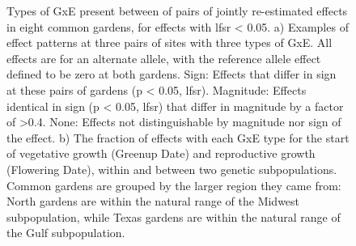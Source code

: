 \documentclass[
  9pt,
  twocolumn,
  twoside]{pnas-new}
\begin{document}
\begin{figure}


\caption{\label{fig-effects}Types of GxE present between of pairs of
jointly re-estimated effects in eight common gardens, for effects with
lfsr \textless{} 0.05. a) Examples of effect patterns at three pairs of
sites with three types of GxE. All effects are for an alternate allele,
with the reference allele effect defined to be zero at both gardens.
Sign: Effects that differ in sign at these pairs of gardens (p
\textless{} 0.05, lfsr). Magnitude: Effects identical in sign (p
\textless{} 0.05, lfsr) that differ in magnitude by a factor of
\textgreater0.4. None: Effects not distinguishable by magnitude nor sign
of the effect. b) The fraction of effects with each GxE type for the
start of vegetative growth (Greenup Date) and reproductive growth
(Flowering Date), within and between two genetic subpopulations. Common
gardens are grouped by the larger region they came from: North gardens
are within the natural range of the Midwest subpopulation, while Texas
gardens are within the natural range of the Gulf subpopulation.}

\end{figure}%
\end{document}
